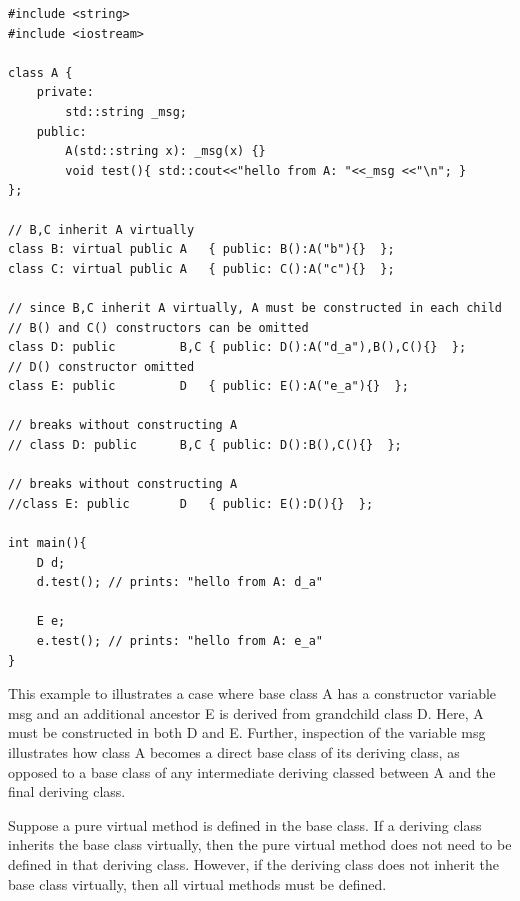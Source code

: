 \documentclass[a4paper,12pt,notitlepage]{article}
\begin{document}
\begin{verbatim}
#include <string>
#include <iostream>

class A { 
    private: 
        std::string _msg; 
    public:
        A(std::string x): _msg(x) {} 
        void test(){ std::cout<<"hello from A: "<<_msg <<"\n"; } 
}; 

// B,C inherit A virtually
class B: virtual public A   { public: B():A("b"){}  }; 
class C: virtual public A   { public: C():A("c"){}  }; 

// since B,C inherit A virtually, A must be constructed in each child
// B() and C() constructors can be omitted
class D: public         B,C { public: D():A("d_a"),B(),C(){}  }; 
// D() constructor omitted
class E: public         D   { public: E():A("e_a"){}  }; 

// breaks without constructing A
// class D: public      B,C { public: D():B(),C(){}  }; 

// breaks without constructing A
//class E: public       D   { public: E():D(){}  }; 

int main(){
    D d; 
    d.test(); // prints: "hello from A: d_a" 
    
    E e; 
    e.test(); // prints: "hello from A: e_a"
}
\end{verbatim}

This example to illustrates a case where base class A has a constructor variable msg and an additional ancestor E is derived from grandchild class D. Here, A must be constructed in both D and E. Further, inspection of the variable msg illustrates how class A becomes a direct base class of its deriving class, as opposed to a base class of any intermediate deriving classed between A and the final deriving class. 

Suppose a pure virtual method is defined in the base class. If a deriving class inherits the base class virtually, then the pure virtual method does not need to be defined in that deriving class. However, if the deriving class does not inherit the base class virtually, then all virtual methods must be defined. 
\end{document}
